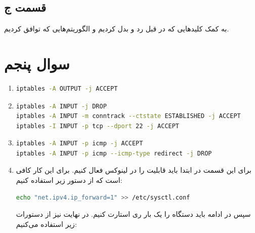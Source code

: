 \documentclass[]{article}
\begin{document}
\subsection*{قسمت ج}
به کمک کلید‌هایی که در قبل رد و بدل کردیم و الگوریتم‌هایی که توافق کردیم.
\section*{سوال پنجم}
\begin{enumerate}
    \item {} \begin{latin}
\begin{lstlisting}[language=sh]
iptables -A OUTPUT -j ACCEPT
\end{lstlisting}
    \end{latin}
    \item {}  \begin{latin}
\begin{lstlisting}[language=sh]
iptables -A INPUT -j DROP
iptables -A INPUT -m conntrack --ctstate ESTABLISHED -j ACCEPT
iptables -I INPUT -p tcp --dport 22 -j ACCEPT
\end{lstlisting}
\end{latin}
    \item {} \begin{latin}
\begin{lstlisting}[language=sh]
iptables -A INPUT -p icmp -j ACCEPT
iptables -A INPUT -p icmp --icmp-type redirect -j DROP
\end{lstlisting}
    \end{latin}
    \item برای این قسمت در ابتدا باید قابلیت  را در لینوکس فعال کنیم. برای این کار کافی است که از دستور زیر استفاده کنیم: \begin{latin}
\begin{lstlisting}[language=sh]
echo "net.ipv4.ip_forward=1" >> /etc/sysctl.conf
\end{lstlisting}
\end{latin}
    سپس در ادامه باید دستگاه را یک بار ری استارت کنیم. در نهایت نیز از دستورات زیر استفاده می‌کنیم: 

\end{enumerate}
\end{document}
